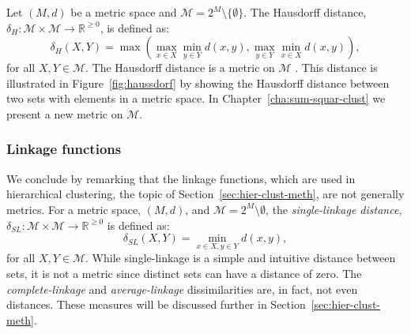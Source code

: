 Let $(M,d)$ be a metric space and $\mathcal{M}=2^M \setminus \{\emptyset\}$.
The Hausdorff distance, $\delta_{H} \colon \mathcal{M} \times \mathcal{M} \to
\mathbb{R}^{\geq 0}$, is defined as:
\begin{equation*}
  \delta_{H}(X,Y) = \max\left(\max_{x \in X} \min_{y \in Y} d(x,y),
                             \max_{y \in Y} \min_{x \in X} d(x,y)\right), 
\end{equation*}
for all $X,Y \in \mathcal{M}$.  The Hausdorff distance is a metric on
$\mathcal{M}$ \citep{braun2003geometry}.  This distance is illustrated in
Figure~\ref{fig:haussdorf} by showing the Hausdorff distance between two sets
with elements in a metric space.  In Chapter~\ref{cha:sum-squar-clust} we
present a new metric on $\mathcal{M}$.

\subsubsection{Linkage functions}
\label{sec:linkage-functions}

We conclude by remarking that the linkage functions, which are used in
hierarchical clustering, the topic of Section~\ref{sec:hier-clust-meth}, are
not generally metrics.  For a metric space, $(M,d)$, and $\mathcal{M}=2^M
\setminus \emptyset$, the \textit{single-linkage distance}, $\delta_{SL}
\colon \mathcal{M} \times \mathcal{M} \to \mathbb{R}^{\geq 0}$ is defined as:
\begin{equation*}
  \delta_{SL}(X,Y) = \min_{x \in X, y \in Y} d(x,y),
\end{equation*}
for all $X,Y \in \mathcal{M}$.  While single-linkage is a simple and intuitive
distance between sets, it is not a metric since distinct sets can have a
distance of zero.  The \textit{complete-linkage} and \textit{average-linkage}
dissimilarities are, in fact, not even distances.  These measures will be
discussed further in Section~\ref{sec:hier-clust-meth}.



